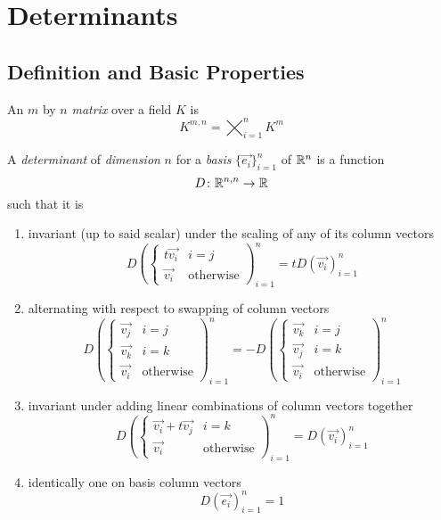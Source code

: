 \documentclass[notes]{subfiles}
\begin{document}
\setcounter{section}{4}
\section{Determinants}
\subsection{Definition and Basic Properties}
\begin{definition}[Matrix]
    An $m$ by $n$ \textit{matrix} over a field $K$ is
    \[
        K^{m, n} = \bigtimes_{i = 1}^n K^m
    \]
\end{definition}

\begin{definition}[Determinant]
    A \textit{determinant} of \textit{dimension} $n$ for a \textit{basis} $\{ \vec{e_i} \}_{i = 1}^n$ of $\mathbb{R}^n$ is a function
    \[
        D\colon \mathbb{R}^{n, n} \to \mathbb{R}
    \]
    such that it is
    \begin{enumerate}[label = (\arabic*)]
        \item invariant (up to said scalar) under the scaling of any of its column vectors
        \[
            D\left(\begin{cases} 
                t\vec{v_i} & i = j \\
                \vec{v_i} & \text{otherwise}
            \end{cases}
            \right)_{i = 1}^n = tD(\vec{v_i})_{i = 1}^n
        \]
        \item alternating with respect to swapping of column vectors
        \[
            D\left(\begin{cases}
                \vec{v_j} & i = j \\
                \vec{v_k} & i = k \\
                \vec{v_i} & \text{otherwise}
            \end{cases}\right)_{i = 1}^n
            =
            -D\left(\begin{cases}
                \vec{v_k} & i = j \\
                \vec{v_j} & i = k \\
                \vec{v_i} & \text{otherwise}
            \end{cases}\right)_{i = 1}^n
        \]
        \item invariant under adding linear combinations of column vectors together
        \[
            D\left(\begin{cases}
                \vec{v_i} + t\vec{v_j} & i = k \\
                \vec{v_i} & \text{otherwise}
            \end{cases}\right)_{i = 1}^n = D(\vec{v_i})_{i = 1}^n
        \]
        \item identically one on basis column vectors
        \[
            D(\vec{e_i})_{i = 1}^n = 1
        \]
    \end{enumerate}
\end{definition}
\end{document}
